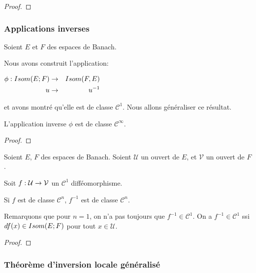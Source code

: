 \ifdefined\outputproof
\begin{proof}

\end{proof}
\fi

\subsubsection{Applications inverses}

Soient $E$ et $F$ des espaces de Banach.

Nous avons construit l'application:

\begin{center}
$
\begin{aligned}
	\phi : 	Isom(E; F) &\rightarrow& Isom(F, E) \\
			u &\rightarrow& u^{-1}
\end{aligned}
$
\end{center}
et avons montré qu'elle est de classe $\mathcal{C}^{1}$. Nous allons généraliser
ce résultat.

\begin{proposition}
	L'application inverse $\phi$ est de classe $\mathcal{C}^{\infty}$.
\end{proposition}

\ifdefined\outputproof
\begin{proof}

\end{proof}
\fi

\begin{proposition}
	Soient $E$, $F$ des espaces de Banach.
	Soient $\mathcal{U}$ un ouvert de $E$, et $\mathcal{V}$ un ouvert de $F$.

	Soit $f : \mathcal{U} \rightarrow \mathcal{V}$ un $\mathcal{C}^{1}$
	difféomorphisme.

	Si $f$ est de classe $\mathcal{C}^{n}$, $f^{-1}$ est de classe
	$\mathcal{C}^{n}$.
\end{proposition}

Remarquons que pour $n = 1$, on n'a pas toujours que $f^{-1} \in
\mathcal{C}^{1}$. On a $f^{-1} \in \mathcal{C}^{1}$ ssi $df(x) \in Isom(E; F)$
pour tout $x \in \mathcal{U}$.

\ifdefined\outputproof
\begin{proof}

\end{proof}
\fi

\subsubsection{Théorème d'inversion locale généralisé}

